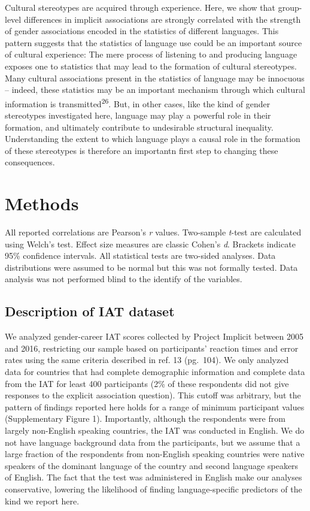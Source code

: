 \documentclass[11pt]{wlscirep}
\begin{document}
Cultural stereotypes are acquired through experience. Here, we show that
group-level differences in implicit associations are strongly correlated with the strength of gender associations encoded in the statistics of different languages. This pattern suggests that the statistics of language use could be an important source of cultural experience: The mere process of
listening to and producing language exposes one to statistics that may
lead to the formation of cultural stereotypes. Many cultural
associations present in the statistics of language may be innocuous --
indeed, these statistics may be an important mechanism through which
cultural information is transmitted\textsuperscript{26}. But, in
other cases, like the kind of gender stereotypes investigated here,
language may play a powerful role in their formation, and ultimately
contribute to undesirable structural inequality. Understanding the extent to which language plays a causal role in the formation of these stereotypes is therefore an importantn first step to changing these consequences.

\section*{Methods}

All reported correlations are Pearson's \emph{r} values.  Two-sample \emph{t}-test are calculated using Welch's test. Effect size measures are classic Cohen's \emph{d}.  Brackets indicate 95\% confidence intervals. All statistical tests are two-sided analyses. Data distributions were assumed to be normal but this was not formally tested. Data analysis was not performed blind to the identify of the variables.

\subsection*{Description of IAT dataset}

We analyzed gender-career IAT scores collected by Project Implicit
between 2005 and 2016, restricting our sample based on participants'
reaction times and error rates using the same criteria described in ref. 13 (pg.~104). We only analyzed data for
countries that had complete demographic information and complete data
from the IAT for least 400 participants (2\% of these respondents did
not give responses to the explicit association question). This cutoff was
arbitrary, but the pattern of findings reported here holds for a range
of minimum participant values (Supplementary Figure 1).  Importantly, although the
respondents were from largely non-English speaking countries, the IAT
was conducted in English. We do not have language background data from
the participants, but we assume that a large fraction of the respondents
from non-English speaking countries were native speakers of the dominant
language of the country and second language speakers of English. The fact that the test was administered in English make our analyses conservative, lowering the likelihood of finding language-specific predictors of the kind we report here.
\end{document}
